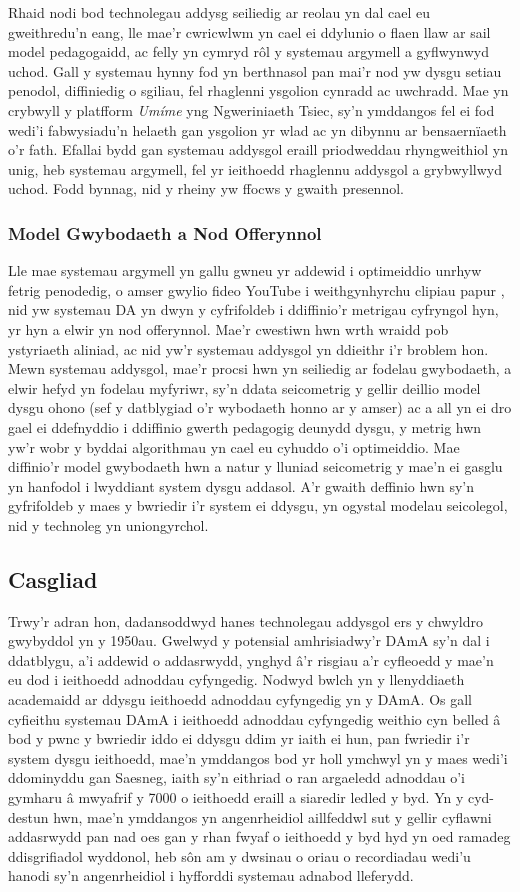 Rhaid nodi bod technolegau addysg seiliedig ar reolau yn dal cael eu gweithredu'n eang, lle mae'r cwricwlwm yn cael ei ddylunio o flaen llaw ar sail model pedagogaidd, ac felly yn cymryd rôl y systemau argymell a gyflwynwyd uchod. Gall y systemau hynny fod yn berthnasol pan mai'r nod yw dysgu setiau penodol, diffiniedig o sgiliau, fel rhaglenni ysgolion cynradd ac uwchradd. Mae \textcite{pelanek_adaptive_2025} yn crybwyll y platfform \textit{Umíme} yng Ngweriniaeth Tsiec, sy'n ymddangos fel ei fod wedi'i fabwysiadu'n helaeth gan ysgolion yr wlad ac yn dibynnu ar bensaernïaeth o'r fath. Efallai bydd gan systemau addysgol eraill priodweddau rhyngweithiol yn unig, heb systemau argymell, fel yr ieithoedd rhaglennu addysgol a grybwyllwyd uchod. Fodd bynnag, nid y rheiny yw ffocws y gwaith presennol.

\subsubsection{Model Gwybodaeth a Nod Offerynnol}
Lle mae systemau argymell yn gallu gwneu yr addewid i optimeiddio unrhyw fetrig penodedig, o amser gwylio fideo YouTube i weithgynhyrchu clipiau papur \parencite{bostrom_ethical_2003}, nid yw systemau DA yn dwyn y cyfrifoldeb i ddiffinio'r metrigau cyfryngol hyn, yr hyn a elwir yn nod offerynnol. Mae'r cwestiwn hwn wrth wraidd pob ystyriaeth aliniad, ac nid yw'r systemau addysgol yn ddieithr i'r broblem hon. Mewn systemau addysgol, mae'r procsi hwn yn seiliedig ar fodelau gwybodaeth, a elwir hefyd yn fodelau myfyriwr, sy'n ddata seicometrig y gellir deillio model dysgu ohono (sef y datblygiad o'r wybodaeth honno ar y amser) ac a all yn ei dro gael ei ddefnyddio i ddiffinio gwerth pedagogig deunydd dysgu, y metrig hwn yw'r wobr y byddai algorithmau yn cael eu cyhuddo o'i optimeiddio. Mae diffinio'r model gwybodaeth hwn a natur y lluniad seicometrig y mae'n ei gasglu yn hanfodol i lwyddiant system dysgu addasol. A'r gwaith deffinio hwn sy'n gyfrifoldeb y maes y bwriedir i'r system ei ddysgu, yn ogystal modelau seicolegol, nid y technoleg yn uniongyrchol.

\subsection{Casgliad}
Trwy'r adran hon, dadansoddwyd hanes technolegau addysgol ers y chwyldro gwybyddol yn y 1950au. Gwelwyd y potensial amhrisiadwy'r DAmA sy'n dal i ddatblygu, a'i addewid o addasrwydd, ynghyd â'r risgiau a'r cyfleoedd y mae'n eu dod i ieithoedd adnoddau cyfyngedig. Nodwyd bwlch yn y llenyddiaeth academaidd ar ddysgu ieithoedd adnoddau cyfyngedig yn y DAmA. Os gall cyfieithu systemau DAmA i ieithoedd adnoddau cyfyngedig weithio cyn belled â bod y pwnc y bwriedir iddo ei ddysgu ddim yr iaith ei hun, pan fwriedir i'r system dysgu ieithoedd, mae'n ymddangos bod yr holl ymchwyl yn y maes wedi'i ddominyddu gan Saesneg, iaith sy'n eithriad o ran argaeledd adnoddau o'i gymharu â mwyafrif y 7000 o ieithoedd eraill a siaredir ledled y byd. Yn y cyd-destun hwn, mae'n ymddangos yn angenrheidiol aillfeddwl sut y gellir cyflawni addasrwydd pan nad oes gan y rhan fwyaf o ieithoedd y byd hyd yn oed ramadeg ddisgrifiadol wyddonol, heb sôn am y dwsinau o oriau o recordiadau wedi'u hanodi sy'n angenrheidiol i hyfforddi systemau adnabod lleferydd.